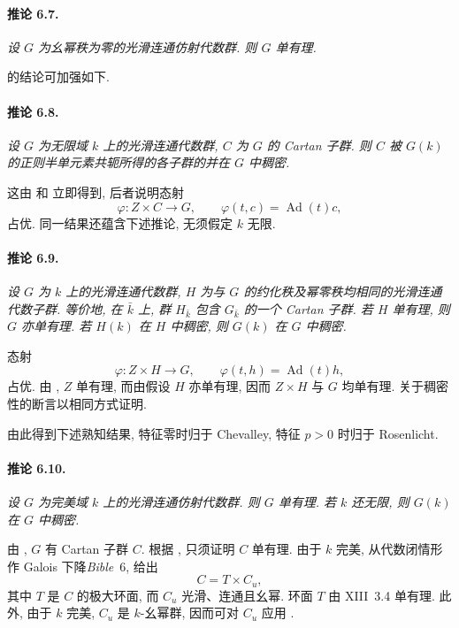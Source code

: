 \paragraph{\textbf{推论 6.7.}}
{\itshape 设 \(G\) 为幺幂秩为零的光滑连通仿射代数群. 则 \(G\) 单有理.}

 的结论可加强如下.

\paragraph{\textbf{推论 6.8.}}
{\itshape 设 \(G\) 为无限域 \(k\) 上的光滑连通代数群, \(C\) 为 \(G\) 的 Cartan 子群. 则 \(C\) 被 \(G(k)\) 的正则半单元素共轭所得的各子群的并在 \(G\) 中稠密.}

这由  和  立即得到, 后者说明态射
\[
  \varphi\colon Z\times C\longrightarrow G,\qquad
  \varphi(t,c)=\operatorname{Ad}(t)c,
\]
占优. 同一结果还蕴含下述推论, 无须假定 \(k\) 无限.

\paragraph{\textbf{推论 6.9.}}
{\itshape 设 \(G\) 为 \(k\) 上的光滑连通代数群, \(H\) 为与 \(G\) 的约化秩及幂零秩均相同的光滑连通代数子群. 等价地, 在 \(\bar k\) 上, 群 \(H_{\bar k}\) 包含 \(G_{\bar k}\) 的一个 Cartan 子群. 若 \(H\) 单有理, 则 \(G\) 亦单有理. 若 \(H(k)\) 在 \(H\) 中稠密, 则 \(G(k)\) 在 \(G\) 中稠密.}

态射
\[
  \varphi\colon Z\times H\longrightarrow G,\qquad
  \varphi(t,h)=\operatorname{Ad}(t)h,
\]
占优. 由 , \(Z\) 单有理, 而由假设 \(H\) 亦单有理, 因而 \(Z\times H\) 与 \(G\) 均单有理. 关于稠密性的断言以相同方式证明.

由此得到下述熟知结果, 特征零时归于 Chevalley, 特征 \(p>0\) 时归于 Rosenlicht.

\paragraph{\textbf{推论 6.10.}}
{\itshape 设 \(G\) 为完美域 \(k\) 上的光滑连通仿射代数群. 则 \(G\) 单有理. 若 \(k\) 还无限, 则 \(G(k)\) 在 \(G\) 中稠密.}

由 , \(G\) 有 Cartan 子群 \(C\). 根据 , 只须证明 \(C\) 单有理. 由于 \(k\) 完美, 从代数闭情形作 Galois 下降\textup{\emph{Bible}~6, } 给出
\[
  C=T\times C_u,
\]
其中 \(T\) 是 \(C\) 的极大环面, 而 \(C_u\) 光滑、连通且幺幂. 环面 \(T\) 由 XIII~3.4 单有理. 此外, 由于 \(k\) 完美, \(C_u\) 是 \(k\)-幺幂群, 因而可对 \(C_u\) 应用 .

